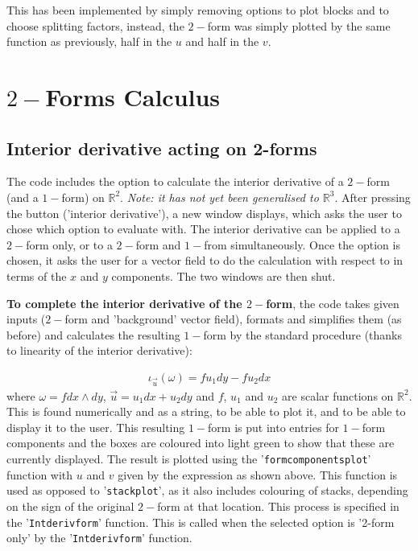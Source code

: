 \documentclass[12pt]{report}
\begin{document}
This has been implemented by simply removing options to plot blocks and to choose splitting factors, instead, the $2-$form was simply plotted by the same function as previously, half in the $u$ and half in the $v$.

\chapter {$2-$Forms Calculus}
\section{Interior derivative acting on 2-forms}
The code includes the option to calculate the interior derivative of a $2-$form (and a $1-$form) on $\mathbb{R}^{2}$. \textit{Note: it has not yet been generalised to $\mathbb{R}^{3}$}. After pressing the button ('interior derivative'), a new window displays, which asks the user to chose which option to evaluate with. The interior derivative can be applied to a $2-$form only, or to a $2-$form and $1-$from simultaneously. Once the option is chosen, it asks the user for a vector field to do the calculation with respect to in terms of the $x$ and $y$ components. The two windows are then shut.

\noindent \textbf{To complete the interior derivative of the $2-$form}, the code takes given inputs ($2-$form and 'background' vector field), formats and simplifies them (as before) and calculates the resulting $1-$form by the standard procedure (thanks to linearity of the interior derivative):

\begin{equation}
	\label{T2} \begin{split}
		\iota_{\vec{u}}(\omega) = f u_{1} dy - f u_{2} dx
	\end{split}
\end{equation}
where $\omega = f dx\wedge dy$, $\vec{u} = u_{1}dx + u_{2}dy$ and $f$, $u_1$ and $u_2$ are scalar functions on $\mathbb{R}^2$.
This is found numerically and as a string, to be able to plot it, and to be able to display it to the user.
This resulting $1-$form is put into entries for $1-$form components and the boxes are coloured into light green to show that these are currently displayed. The result is plotted using the '\texttt{form\textunderscore components\textunderscore plot}' function with $u$ and $v$ given by the expression as shown above. This function is used as opposed to '\texttt{stack\textunderscore plot}', as it also includes colouring of stacks, depending on the sign of the original $2-$form at that location.
This process is specified in the '\texttt{Int\textunderscore deriv\textunderscore form}' function. This is called when the selected option is '2-form only' by the '\texttt{Int\textunderscore deriv\textunderscore form}' function.
\end{document}
